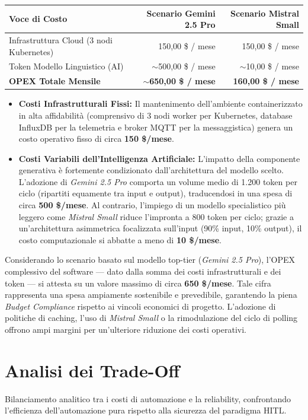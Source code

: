\begin{table}[ht]
\centering
\begin{tabular}{lrr}
\hline
\textbf{Voce di Costo} & \textbf{Scenario Gemini 2.5 Pro} & \textbf{Scenario Mistral Small} \\ \hline
Infrastruttura Cloud (3 nodi Kubernetes) & 150,00 \$ / mese & 150,00 \$ / mese \\
Token Modello Linguistico (AI) & $\sim$500,00 \$ / mese & $\sim$10,00 \$ / mese \\ \hline
\textbf{OPEX Totale Mensile} & \textbf{$\sim$650,00 \$ / mese} & \textbf{160,00 \$ / mese} \\ \hline
\end{tabular}
\label{tab:costi_opex}
\end{table}

\begin{itemize}
    \item \textbf{Costi Infrastrutturali Fissi:} Il mantenimento dell'ambiente containerizzato in alta affidabilità (comprensivo di 3 nodi worker per Kubernetes, database InfluxDB per la telemetria e broker MQTT per la messaggistica) genera un costo operativo fisso di circa \textbf{150 \$/mese}.
    \item \textbf{Costi Variabili dell'Intelligenza Artificiale:} L'impatto della componente generativa è fortemente condizionato dall'architettura del modello scelto. L'adozione di \textit{Gemini 2.5 Pro} comporta un volume medio di 1.200 token per ciclo (ripartiti equamente tra input e output), traducendosi in una spesa di circa \textbf{500 \$/mese}. Al contrario, l'impiego di un modello specialistico più leggero come \textit{Mistral Small} riduce l'impronta a 800 token per ciclo; grazie a un'architettura asimmetrica focalizzata sull'input (90\% input, 10\% output), il costo computazionale si abbatte a meno di \textbf{10 \$/mese}.
\end{itemize}
Considerando lo scenario basato sul modello top-tier (\textit{Gemini 2.5 Pro}), l'OPEX complessivo del software — dato dalla somma dei costi infrastrutturali e dei token — si attesta su un valore massimo di circa \textbf{650 \$/mese}. Tale cifra rappresenta una spesa ampiamente sostenibile e prevedibile, garantendo la piena \textit{Budget Compliance} rispetto ai vincoli economici di progetto. L'adozione di politiche di caching, l'uso di \textit{Mistral Small} o la rimodulazione del ciclo di polling offrono ampi margini per un'ulteriore riduzione dei costi operativi.

\section{Analisi dei Trade-Off}
\label{sec:analisi_tradeoff}
Bilanciamento analitico tra i costi di automazione e la reliability, confrontando l'efficienza dell'automazione pura rispetto alla sicurezza del paradigma HITL.